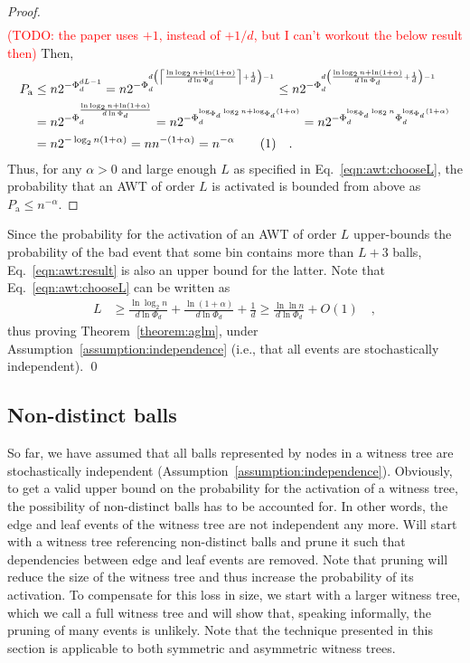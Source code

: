 \documentclass[a4paper,12pt]{article}
\newcommand\todo[1]{\textcolor{red}{(TODO: #1)}}
\newcommand\numberthis{\addtocounter{equation}{1}\tag{\theequation}}
\newcommand\neqn[1]{\numberthis\label{eqn:#1}}
\begin{document}
\begin{proof}
\begin{align*}
\end{align*}
\todo{the paper uses $+1$, instead of $+1/d$, but I can't workout the below result then} 
Then, 
\begin{align*}
P_\mathrm{a} &\leq n  2^{-\Phi_d^{d L -1}} 
        = n  2^{-\Phi_d^{d \left(\left\lceil{\frac{\ln\log_2 n + \ln\left(1+\alpha\right)}{d \ln \Phi_d}}\right\rceil+\frac{1}{d}\right) -1}} 
        \leq n  2^{-\Phi_d^{d \left({\frac{\ln\log_2 n + \ln\left(1+\alpha\right)}{d \ln \Phi_d}}+\frac{1}{d}\right) -1}} \\
        &= n  2^{-\Phi_d^{{\frac{\ln\log_2 n + \ln\left(1+\alpha\right)}{d \ln \Phi_d}}}} 
        = n  2^{-\Phi_d^{\log_{\Phi_d}\log_2 n + \log_{\Phi_d}\left(1+\alpha\right)}} 
        = n  2^{-\Phi_d^{\log_{\Phi_d}\log_2 n} \Phi_d^{ \log_{\Phi_d}\left(1+\alpha\right)}} \\
         &= n  2^{-\log_2 n \left(1+\alpha\right)} 
         = n  n ^{-(1+\alpha)} = n^{-\alpha} \neqn{awt:result} \quad .
\end{align*}
Thus, for any $\alpha>0$ and large enough $L$ as specified in Eq.~\ref{eqn:awt:chooseL}, the probability that an AWT of order $L$ is activated is bounded from above as $P_\mathrm{a}\leq n^{-\alpha}$.
\end{proof}
Since the probability for the activation of an AWT of order $L$ upper-bounds the probability of the bad event that some bin contains more than $L+3$ balls, Eq.~\ref{eqn:awt:result} is also an upper bound for the latter. Note that Eq.~\ref{eqn:awt:chooseL} can be written as
\begin{align*}
L &\geq \frac{\ln\log_2 n}{d \ln \Phi_d} + \frac{\ln\left(1+\alpha\right)}{d \ln \Phi_d} + \frac{1}{d}
  \geq \frac{\ln\ln n}{d \ln \Phi_d} + O\left(1\right)\quad ,
\end{align*}
thus proving Theorem~\ref{theorem:aglm}, under Assumption~\ref{assumption:independence} (i.e., that all events are stochastically independent). \qed

\subsection{Non-distinct balls}
\label{sec:analysis:nondistinctBalls}
So far, we have assumed that all balls represented by nodes in a witness tree are stochastically independent (Assumption~\ref{assumption:independence}). Obviously, to get a valid upper bound on the probability for the activation of a witness tree, the possibility of non-distinct balls has to be accounted for. In other words, the edge and leaf events of the witness tree are not independent any more. Will start with a witness tree referencing non-distinct balls and prune it such that dependencies between edge and leaf events are removed. Note that pruning will reduce the size of the witness tree and thus increase the probability of its activation. To compensate for this loss in size, we start with a larger witness tree, which we call a full witness tree and will show that, speaking informally, the pruning of many events is unlikely. Note that the technique presented in this section is applicable to both symmetric and asymmetric witness trees. 
\end{document}
